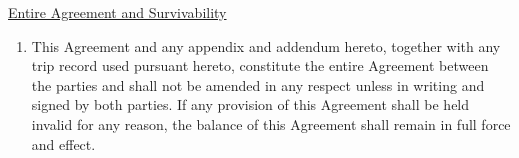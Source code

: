 \underline{Entire Agreement and Survivability}
\begin{enumerate}[
    ref = \SecondLevelEnumerator
]
    \item This Agreement and any appendix and addendum hereto, together
    with any trip record used pursuant hereto, constitute the entire
    Agreement between the parties and shall not be amended in any respect
    unless in writing and signed by both parties. If any provision of this
    Agreement shall be held invalid for any reason, the balance of this
    Agreement shall remain in full force and effect.
\end{enumerate}